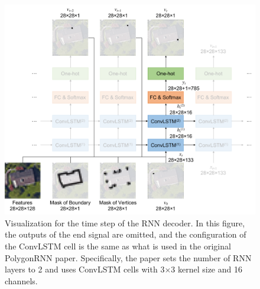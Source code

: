 \begin{figure}[!h]
	\centering
	\includegraphics[width=\fig\textwidth]{3-05.pdf}
    \caption[Visualization for the time step of the RNN decoder]{Visualization for the time step of the RNN decoder. In this figure, the outputs of the end signal are omitted, and the configuration of the ConvLSTM cell is the same as what is used in the original PolygonRNN paper. Specifically, the paper sets the number of RNN layers to 2 and uses ConvLSTM cells with 3$\times$3 kernel size and 16 channels.}
    \label{fig:rnnconvlstm}
\end{figure}